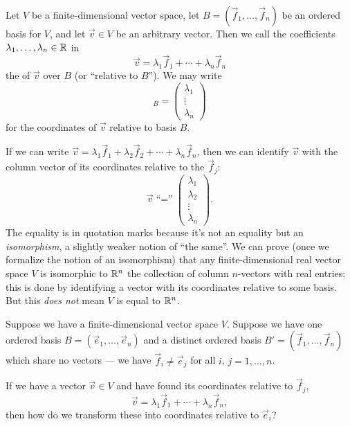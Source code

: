 \begin{definition}\label{defn:basis:coordinates}
Let $V$ be a finite-dimensional vector space, let
$B=(\vec{f}_{1},\dots,\vec{f}_{n})$ be an ordered basis for $V$, and let
$\vec{v}\in V$ be an arbitrary vector. Then we call the coefficients
$\lambda_{1},\dots,\lambda_{n}\in\mathbb{R}$ in
\begin{equation}
\vec{v} = \lambda_{1}\vec{f}_{1} + \cdots + \lambda_{n}\vec{f}_{n}
\end{equation}
the  of $\vec{v}$ over $B$ (or ``relative to $B$'').
We may write
\begin{equation}
[\vec{v}]_{B} = \begin{pmatrix}\lambda_{1}\\\vdots\\\lambda_{n}
\end{pmatrix}
\end{equation}
for the coordinates of $\vec{v}$ relative to basis $B$.
\end{definition}

\begin{remark}
If we can write $\vec{v} = \lambda_{1}\vec{f}_{1} + \lambda_{2}\vec{f}_{2} + \cdots + \lambda_{n}\vec{f}_{n}$,
then we can identify $\vec{v}$ with the column vector of its coordinates
relative to the $\vec{f}_{j}$:
\begin{equation}
  \vec{v} \mathrel{\mbox{``=''}}
  \begin{pmatrix}\lambda_{1}\\\lambda_{2}\\\vdots\\\lambda_{n}
  \end{pmatrix}.
\end{equation}
The equality is in quotation marks because it's not an equality but an \emph{isomorphism},
a slightly weaker notion of ``the same''.
We can prove (once we formalize the notion of an isomorphism) that any
finite-dimensional real vector space $V$ is isomorphic to $\mathbb{R}^{n}$ the
collection of column $n$-vectors with real entries; this is done by
identifying a vector with its coordinates relative to some basis. 
But this \emph{does not} mean $V$ is equal to $\mathbb{R}^{n}$.
\end{remark}

\begin{problem}
Suppose we have a finite-dimensional vector space $V$.
Suppose we have one ordered basis $B=(\vec{e}_{1},\dots,\vec{e}_{n})$
and a distinct ordered basis $B'=(\vec{f}_{1},\dots,\vec{f}_{n})$
which share no vectors --- we have $\vec{f}_{i}\neq\vec{e}_{j}$
for all $i$, $j=1,\dots,n$.

If we have a vector $\vec{v}\in V$ and have found its coordinates
relative to $\vec{f}_{j}$,
\begin{equation}
\vec{v} = \lambda_{1}\vec{f}_{1} + \cdots + \lambda_{n}\vec{f}_{n},
\end{equation}
then how do we transform these into coordinates relative to $\vec{e}_{i}$?
\end{problem}

